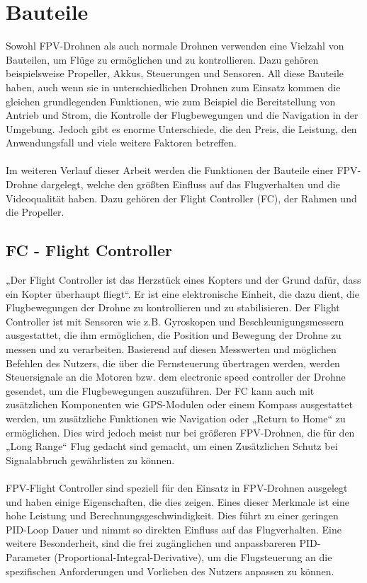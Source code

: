 \section[Bauteile]{Bauteile}
    Sowohl FPV-Drohnen als auch normale Drohnen verwenden eine Vielzahl von Bauteilen, um Flüge zu ermöglichen und zu kontrollieren. Dazu gehören beispielsweise Propeller, Akkus, Steuerungen und Sensoren. All diese Bauteile haben, auch wenn sie in unterschiedlichen Drohnen zum Einsatz kommen die gleichen grundlegenden Funktionen, wie zum Beispiel die Bereitstellung von Antrieb und Strom, die Kontrolle der Flugbewegungen und die Navigation in der Umgebung. Jedoch gibt es enorme Unterschiede, die den Preis, die Leistung, den Anwendungsfall und viele weitere Faktoren betreffen.
    \\ \\
    Im weiteren Verlauf dieser Arbeit werden die Funktionen der Bauteile einer FPV-Drohne dargelegt, welche den größten Einfluss auf das Flugverhalten und die Videoqualität haben. Dazu gehören der Flight Controller (FC), der Rahmen und die Propeller. 

\subsection[FC - Flight Controller]{FC - Flight Controller}
    „Der Flight Controller ist das Herzstück eines Kopters und der Grund dafür, dass ein Kopter überhaupt fliegt“. Er ist eine elektronische Einheit, die dazu dient, die Flugbewegungen der Drohne zu kontrollieren und zu stabilisieren. Der Flight Controller ist mit Sensoren wie z.B. Gyroskopen und Beschleunigungsmessern ausgestattet, die ihm ermöglichen, die Position und Bewegung der Drohne zu messen und zu verarbeiten. Basierend auf diesen Messwerten und möglichen Befehlen des Nutzers, die über die Fernsteuerung übertragen werden, werden Steuersignale an die Motoren bzw. dem electronic speed controller der Drohne gesendet, um die Flugbewegungen auszuführen. Der FC kann auch mit zusätzlichen Komponenten wie GPS-Modulen oder einem Kompass ausgestattet werden, um zusätzliche Funktionen wie Navigation oder „Return to Home“ zu ermöglichen. Dies wird jedoch meist nur bei größeren FPV-Drohnen, die für den „Long Range“ Flug gedacht sind gemacht, um einen Zusätzlichen Schutz bei Signalabbruch gewährlisten zu können.
    \\ \\
    FPV-Flight Controller sind speziell für den Einsatz in FPV-Drohnen ausgelegt und haben einige Eigenschaften, die dies zeigen. Eines dieser Merkmale ist eine hohe Leistung und Berechnungsgeschwindigkeit. Dies führt zu einer geringen PID-Loop Dauer und nimmt so direkten Einfluss auf das Flugverhalten. Eine weitere Besonderheit, sind die frei zugänglichen und anpassbareren PID-Parameter (Proportional-Integral-Derivative), um die Flugsteuerung an die spezifischen Anforderungen und Vorlieben des Nutzers anpassen zu können.

